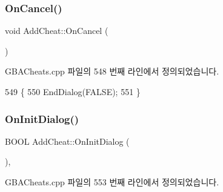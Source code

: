 \subsubsection{\texorpdfstring{On\+Cancel()}{OnCancel()}}
{\footnotesize\ttfamily void Add\+Cheat\+::\+On\+Cancel (\begin{DoxyParamCaption}{ }\end{DoxyParamCaption})\hspace{0.3cm}{\ttfamily [protected]}}



G\+B\+A\+Cheats.\+cpp 파일의 548 번째 라인에서 정의되었습니다.


\begin{DoxyCode}
549 \{
550   EndDialog(FALSE);
551 \}
\end{DoxyCode}
\mbox{\label{class_add_cheat_a92017eb0efe50e09e7c3e5e4980a18cb}} 
\subsubsection{\texorpdfstring{On\+Init\+Dialog()}{OnInitDialog()}}
{\footnotesize\ttfamily B\+O\+OL Add\+Cheat\+::\+On\+Init\+Dialog (\begin{DoxyParamCaption}{ }\end{DoxyParamCaption})\hspace{0.3cm}{\ttfamily [protected]}, {\ttfamily [virtual]}}



G\+B\+A\+Cheats.\+cpp 파일의 553 번째 라인에서 정의되었습니다.


